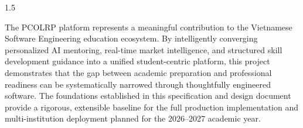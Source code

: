 \documentclass[12pt,a4paper]{report}
\begin{document}
\begin{spacing}{1.5}
		\vspace{1cm}
		
		\begin{tcolorbox}[colback=mainblue!5, colframe=mainblue, title={\textbf{Final Conclusion}}]
			The PCOLRP platform represents a meaningful contribution to the Vietnamese Software Engineering education ecosystem. By intelligently converging personalized AI mentoring, real-time market intelligence, and structured skill development guidance into a unified student-centric platform, this project demonstrates that the gap between academic preparation and professional readiness can be systematically narrowed through thoughtfully engineered software. The foundations established in this specification and design document provide a rigorous, extensible baseline for the full production implementation and multi-institution deployment planned for the 2026--2027 academic year.
		\end{tcolorbox}
		
	\end{spacing}
	
\end{document}
